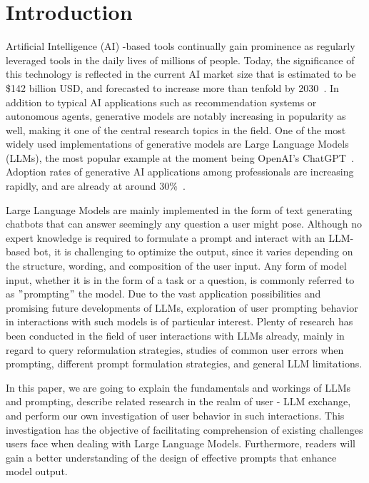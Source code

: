 \section{Introduction}
\label{sec:introduction}

\sloppy %
Artificial Intelligence (AI) -based tools continually gain prominence as regularly leveraged tools in the
daily lives of millions of people.
Today, the significance of this technology is reflected in the current AI market size that is
estimated to be \$142 billion USD, and forecasted to increase more than tenfold by 2030~\cite{statista_artificial_2023}.
In addition to typical AI applications such as recommendation systems or autonomous agents, generative
models are notably increasing in popularity as well, making it one of the central research topics
in the field.
One of the most widely used implementations of generative models are Large Language Models (LLMs),
the most popular example at the moment being OpenAI's ChatGPT~\cite{openai_chatgpt_2023}.
Adoption rates of generative AI applications among professionals are increasing rapidly, and are
already at
around 30\%~\cite{statista_us_2022}.

Large Language Models are mainly implemented in the form of text generating chatbots that can
answer seemingly any question a user might pose.
Although no expert knowledge is required to formulate a prompt and interact with an LLM-based bot, it is challenging to optimize the output, since it varies depending on the structure, wording,
and composition of the user input. %
Any form of model input, whether it is in the form of a task or a question, is commonly
referred to as \("\)prompting\("\) the model.
Due to the vast application possibilities and promising future developments of LLMs, exploration of
user prompting behavior in interactions with such models is of particular interest.
Plenty of research has been conducted in the field of user interactions with LLMs already,
mainly in regard to query reformulation strategies, studies of common user errors when prompting,
different prompt formulation strategies, and general LLM limitations.

In this paper, we are going to explain the fundamentals and workings of LLMs and prompting,
describe related research in the realm of user - LLM exchange, and perform our own investigation of
user behavior in such interactions.
This investigation has the objective of facilitating comprehension of existing challenges users
face when dealing with Large Language Models.
Furthermore, readers will gain a better understanding of the design of effective prompts that
enhance model output.

